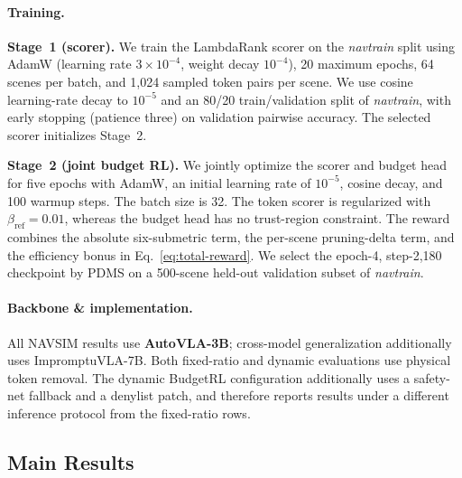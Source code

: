 \documentclass[letterpaper]{article} %
\begin{document}
\paragraph{Training.}
\textbf{Stage~1 (scorer).} We train the LambdaRank scorer on the
\emph{navtrain} split using AdamW (learning rate $3\times10^{-4}$, weight
decay $10^{-4}$), 20 maximum epochs, 64 scenes per batch, and 1{,}024 sampled
token pairs per scene. We use cosine learning-rate decay to $10^{-5}$ and an
80/20 train/validation split of \emph{navtrain}, with early stopping (patience
three) on validation pairwise accuracy. The selected scorer initializes Stage~2.

\textbf{Stage~2 (joint budget RL).} We jointly optimize the scorer and budget
head for five epochs with AdamW, an initial learning rate of $10^{-5}$, cosine
decay, and 100 warmup steps. The batch size is 32. The token scorer is
regularized with $\beta_{\mathrm{ref}}=0.01$, whereas the budget head has no
trust-region constraint. The reward combines the absolute six-submetric term, the per-scene
pruning-delta term, and the efficiency bonus in Eq.~\ref{eq:total-reward}. We
select the epoch-4, step-2{,}180 checkpoint by PDMS on a 500-scene held-out
validation subset of \emph{navtrain}.

\paragraph{Backbone \& implementation.}
All NAVSIM results use \textbf{AutoVLA-3B}; cross-model generalization
additionally uses ImpromptuVLA-7B. Both fixed-ratio and dynamic evaluations use
physical token removal. The dynamic BudgetRL configuration additionally uses a
safety-net fallback and a denylist patch, and therefore reports results under a
different inference protocol from the fixed-ratio rows.

\subsection{Main Results}
\label{sec:main}
\end{document}
